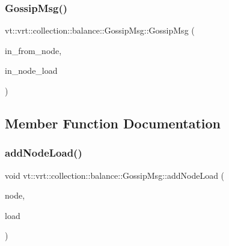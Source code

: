 \subsubsection{\texorpdfstring{Gossip\+Msg()}{GossipMsg()}\hspace{0.1cm}{\footnotesize\ttfamily [2/2]}}
{\footnotesize\ttfamily vt\+::vrt\+::collection\+::balance\+::\+Gossip\+Msg\+::\+Gossip\+Msg (\begin{DoxyParamCaption}\item[{\hyperlink{namespacevt_a866da9d0efc19c0a1ce79e9e492f47e2}{Node\+Type}}]{in\+\_\+from\+\_\+node,  }\item[{\hyperlink{structvt_1_1vrt_1_1collection_1_1balance_1_1_gossip_msg_a8deef056cb137cfd67540a31be189122}{Node\+Load\+Type} const \&}]{in\+\_\+node\+\_\+load }\end{DoxyParamCaption})\hspace{0.3cm}{\ttfamily [inline]}}



\subsection{Member Function Documentation}
\mbox{\label{structvt_1_1vrt_1_1collection_1_1balance_1_1_gossip_msg_ad71cb026dce420d7c5e48d0fd87c2e61}} 
\subsubsection{\texorpdfstring{add\+Node\+Load()}{addNodeLoad()}}
{\footnotesize\ttfamily void vt\+::vrt\+::collection\+::balance\+::\+Gossip\+Msg\+::add\+Node\+Load (\begin{DoxyParamCaption}\item[{\hyperlink{namespacevt_a866da9d0efc19c0a1ce79e9e492f47e2}{Node\+Type}}]{node,  }\item[{\hyperlink{structvt_1_1vrt_1_1collection_1_1lb_1_1_base_l_b_a215e22b9f12678303f49615ae3be05cc}{lb\+::\+Base\+L\+B\+::\+Load\+Type}}]{load }\end{DoxyParamCaption})\hspace{0.3cm}{\ttfamily [inline]}}

